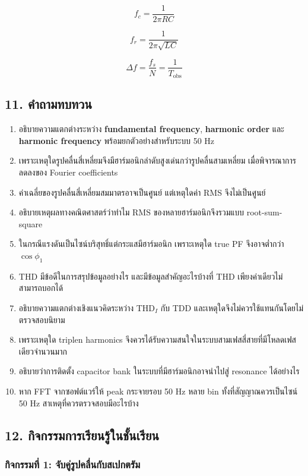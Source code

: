 \[
f_c=\frac{1}{2\pi RC}
\]

\[
f_r=\frac{1}{2\pi\sqrt{LC}}
\]

\[
\Delta f=\frac{f_s}{N}=\frac{1}{T_{\mathrm{obs}}}
\]



\subsection{11. คำถามทบทวน}

\begin{enumerate}
    \item อธิบายความแตกต่างระหว่าง \textbf{fundamental frequency}, \textbf{harmonic order} และ \textbf{harmonic frequency} พร้อมยกตัวอย่างสำหรับระบบ 50 Hz
    \item เพราะเหตุใดรูปคลื่นสี่เหลี่ยมจึงมีฮาร์มอนิกลำดับสูงเด่นกว่ารูปคลื่นสามเหลี่ยม เมื่อพิจารณาการลดลงของ Fourier coefficients
    \item ค่าเฉลี่ยของรูปคลื่นสี่เหลี่ยมสมมาตรอาจเป็นศูนย์ แต่เหตุใดค่า RMS จึงไม่เป็นศูนย์
    \item อธิบายเหตุผลทางคณิตศาสตร์ว่าทำไม RMS ของหลายฮาร์มอนิกจึงรวมแบบ root-sum-square
    \item ในกรณีแรงดันเป็นไซน์บริสุทธิ์แต่กระแสมีฮาร์มอนิก เพราะเหตุใด true PF จึงอาจต่ำกว่า $\cos\phi_1$
    \item THD มีข้อดีในการสรุปข้อมูลอย่างไร และมีข้อมูลสำคัญอะไรบ้างที่ THD เพียงค่าเดียวไม่สามารถบอกได้
    \item อธิบายความแตกต่างเชิงแนวคิดระหว่าง THD$_I$ กับ TDD และเหตุใดจึงไม่ควรใช้แทนกันโดยไม่ตรวจสอบนิยาม
    \item เพราะเหตุใด triplen harmonics จึงควรได้รับความสนใจในระบบสามเฟสสี่สายที่มีโหลดเฟสเดียวจำนวนมาก
    \item อธิบายว่าการติดตั้ง capacitor bank ในระบบที่มีฮาร์มอนิกอาจนำไปสู่ resonance ได้อย่างไร
    \item หาก FFT จากซอฟต์แวร์ให้ peak กระจายรอบ 50 Hz หลาย bin ทั้งที่สัญญาณควรเป็นไซน์ 50 Hz สาเหตุที่ควรตรวจสอบมีอะไรบ้าง
\end{enumerate}

\newpage

\subsection{12. กิจกรรมการเรียนรู้ในชั้นเรียน}

\subsubsection{กิจกรรมที่ 1: จับคู่รูปคลื่นกับสเปกตรัม}

